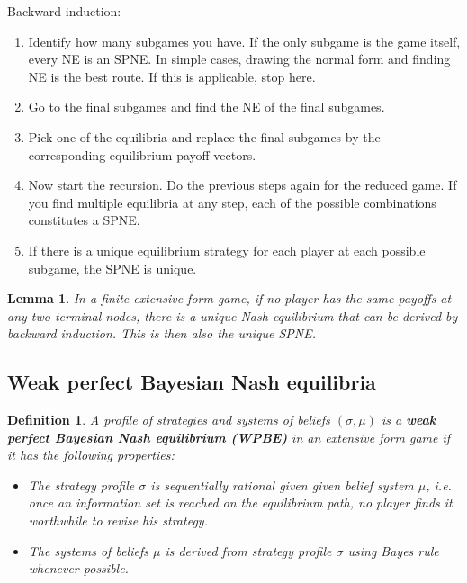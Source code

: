 \documentclass[letter, 11pt]{article}
\theoremstyle{basic}
\newtheorem{definition}{Definition}[section]
\newtheorem{lemma}[theorem]{Lemma}
\begin{document}
\begin{spacing}{1.0}
Backward induction:

\begin{enumerate}
\item Identify how many subgames you have. If the only subgame is the game
  itself, every NE is an SPNE. In simple cases, drawing the normal form and
  finding NE is the best route. If this is applicable, stop here.
\item Go to the final subgames and find the NE of the final subgames.
\item Pick one of the equilibria and replace the final subgames by the
  corresponding equilibrium payoff vectors.
\item Now start the recursion. Do the previous steps again for the reduced
  game. If you find multiple equilibria at any step, each of the possible
  combinations constitutes a SPNE.
\item If there is a unique equilibrium strategy for each player at each
  possible subgame, the SPNE is unique.
\end{enumerate}

\begin{lemma}
  In a finite extensive form game, if no player has the same payoffs at any
  two terminal nodes, there is a unique Nash equilibrium that can be
  derived by backward induction. This is then also the unique SPNE.
\end{lemma}

\subsection{Weak perfect Bayesian Nash equilibria}

\begin{definition}
  A profile of strategies and systems of beliefs $(\sigma, \mu)$ is a
  \textbf{weak perfect Bayesian Nash equilibrium (WPBE)} in an extensive
  form game if it has the following properties:
  \begin{itemize}
  \item The strategy profile $\sigma$ is sequentially rational given given
    belief system $\mu$, i.e. once an information set is reached on the
    equilibrium path, no player finds it worthwhile to revise his strategy.
  \item The systems of beliefs $\mu$ is derived from strategy profile
    $\sigma$ using Bayes rule whenever possible.
  \end{itemize}
\end{definition}


\end{spacing}
\end{document}
